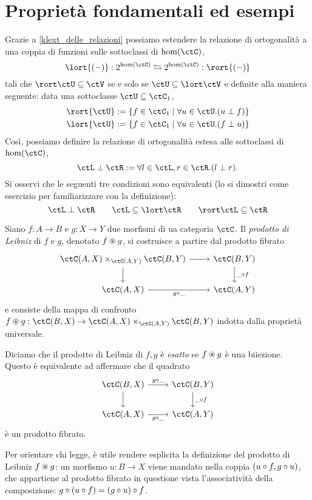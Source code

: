\section[Proprietà ed esempi]{Proprietà fondamentali ed esempi}
\begin{remark}
	Grazie a \ref{klext_delle_relazioni} possiamo estendere la relazione di ortogonalità a una coppia di funzioni sulle sottoclassi di \(\hom(\ctC)\),
	\[\lort{(-)} : 2^{\hom(\ctC)} \leftrightarrows 2^{\hom(\ctC)} : \rort{(-)}\]
	tali che \(\rort\ctU\subseteq\ctV\) se e solo se \(\ctU\subseteq\lort\ctV\) e definite alla maniera seguente: data una sottoclasse \(\ctU\subseteq \ctC_1\),
	\begin{gather*}
		\rort{\ctU} := \{f\in\ctC_1\mid \forall u\in\ctU.(u\perp f)\}\\
		\lort{\ctU} := \{f\in\ctC_1\mid \forall u\in\ctU.(f\perp u)\}
	\end{gather*}
	Così, possiamo definire la relazione di ortogonalità estesa alle sottoclassi di \(\hom(\ctC)\),
	\[\ctL\perp \ctR := \forall l\in\ctL,r\in\ctR.(l\perp r).\]
	Si osservi che le seguenti tre condizioni sono equivalenti (lo si dimostri come esercizio per familiarizzare con la definizione):
	\[\ctL\perp\ctR\qquad \ctL\subseteq\lort\ctR\qquad \rort\ctL\subseteq \ctR\]
\end{remark}
\begin{definition}
	Siano \(f : A \to B\) e \(g : X\to Y\) due morfismi di ua categoria \(\ctC\). Il \emph{prodotto di Leibniz} di \(f\) e \(g\), denotato \(f\oast g\), si costruisce a partire dal prodotto fibrato
	\[
		\begin{tikzcd}
			\pull {\ctC(A,X)}{\ctC(B,Y)}{\ctC(A,Y)} \ar[r]\ar[d] & \ctC(B,Y) \ar[d, "\_\cmp f"]\\
			\ctC(A,X) \ar[r, "g\cmp\_"'] & \ctC(A,Y)
		\end{tikzcd}
	\]
	e consiste della mappa di confronto \(f\oast g : \ctC(B,X) \to \pull {\ctC(A,X)}{\ctC(B,Y)}{\ctC(A,Y)}\) indotta dalla proprietà universale.

	Diciamo che il prodotto di Leibniz di \(f,g\) è \emph{esatto} se \(f\oast g\) è una biiezione. Questo è equivalente ad affermare che il quadrato
	\[
		\begin{tikzcd}
			\ctC(B,X) \ar[d]\ar[r,"g\cmp\_"]& \ctC(B,Y)\ar[d, "\_\cmp f"]\\
			\ctC(A,X) \ar[r, "g\cmp\_"'] & \ctC(A,Y)
		\end{tikzcd}
	\]
	è un prodotto fibrato.
\end{definition}
Per orientare chi legge, è utile rendere esplicita la definizione del prodotto di Leibniz \(f\oast g\): un morfismo \(u : B\to X\) viene mandato nella coppia \((u\circ f, g\circ u)\), che appartiene al prodotto fibrato in questione vista l'associatività della composizione: \(g\circ (u\circ f) = (g\circ u)\circ f\).

